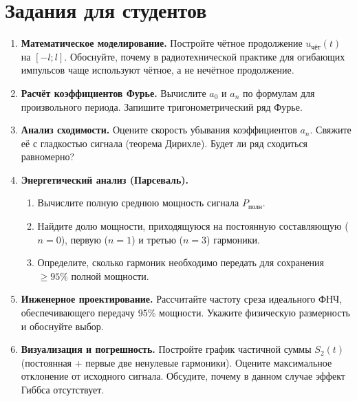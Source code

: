 \documentclass[a4paper,12pt]{article}
\begin{document}
\section{Задания для студентов}
\begin{enumerate}[label=\textbf{\arabic*.}, leftmargin=*]
    \item \textbf{Математическое моделирование.} Постройте чётное продолжение $u_{\text{чёт}}(t)$ на $[-l; l]$. Обоснуйте, почему в радиотехнической практике для огибающих импульсов чаще используют чётное, а не нечётное продолжение.
    
    \item \textbf{Расчёт коэффициентов Фурье.} Вычислите $a_0$ и $a_n$ по формулам для произвольного периода. Запишите тригонометрический ряд Фурье.
    
    \item \textbf{Анализ сходимости.} Оцените скорость убывания коэффициентов $a_n$. Свяжите её с гладкостью сигнала (теорема Дирихле). Будет ли ряд сходиться равномерно?
    
    \item \textbf{Энергетический анализ (Парсеваль).}
    \begin{enumerate}[label=\alph*), leftmargin=2em]
        \item Вычислите полную среднюю мощность сигнала $P_{\text{полн}}$.
        \item Найдите долю мощности, приходящуюся на постоянную составляющую ($n=0$), первую ($n=1$) и третью ($n=3$) гармоники.
        \item Определите, сколько гармоник необходимо передать для сохранения $\ge 95\%$ полной мощности.
    \end{enumerate}
    
    \item \textbf{Инженерное проектирование.} Рассчитайте частоту среза идеального ФНЧ, обеспечивающего передачу 95\% мощности. Укажите физическую размерность и обоснуйте выбор.
    
    \item \textbf{Визуализация и погрешность.} Постройте график частичной суммы $S_2(t)$ (постоянная + первые две ненулевые гармоники). Оцените максимальное отклонение от исходного сигнала. Обсудите, почему в данном случае эффект Гиббса отсутствует.
\end{enumerate}
\end{document}
